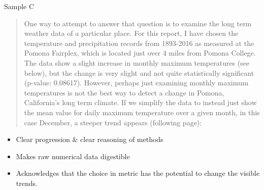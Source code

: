 \documentclass{article}\usepackage[]{graphicx}\usepackage[]{color}
\begin{document}
Sample C
\begin{quote}
One way to attempt to answer that question is to examine the long term weather data of a particular place. For this report, I have chosen the temperature and precipitation records from 1893-2016 as measured at the Pomona Fairplex, which is located just over 4 miles from Pomona College. The data show a slight increase in monthly maximum temperatures (see below), but the change is very slight and not quite statistically significant (p-value: 0.08617). However, perhaps just examining monthly maximum temperatures is not the best way to detect a change in Pomona, California’s long term climate. If we simplify the data to instead just show the mean value for daily maximum temperature over a given month, in this case December, a steeper trend appears (following page):
\end{quote}
\begin{itemize}
  \item Clear progression \& clear reasoning of methods
  \item Makes raw numerical data digestible
  \item Acknowledges that the choice in metric has the potential to change the visible trends. 
\end{itemize}
\end{document}
